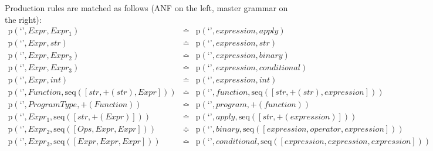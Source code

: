 Production rules are matched as follows (ANF on the left, master grammar on the right):
\begin{eqnarray*}
\mathrm{p}\left(\text{`'},\mathit{Expr},\mathit{Expr_1}\right) & \bumpeq & \mathrm{p}\left(\text{`'},\mathit{expression},\mathit{apply}\right) \\
\mathrm{p}\left(\text{`'},\mathit{Expr},str\right) & \bumpeq & \mathrm{p}\left(\text{`'},\mathit{expression},str\right) \\
\mathrm{p}\left(\text{`'},\mathit{Expr},\mathit{Expr_2}\right) & \bumpeq & \mathrm{p}\left(\text{`'},\mathit{expression},\mathit{binary}\right) \\
\mathrm{p}\left(\text{`'},\mathit{Expr},\mathit{Expr_3}\right) & \bumpeq & \mathrm{p}\left(\text{`'},\mathit{expression},\mathit{conditional}\right) \\
\mathrm{p}\left(\text{`'},\mathit{Expr},int\right) & \bumpeq & \mathrm{p}\left(\text{`'},\mathit{expression},int\right) \\
\mathrm{p}\left(\text{`'},\mathit{Function},\mathrm{seq}\left(\left[str, \plus \left(str\right), \mathit{Expr}\right]\right)\right) & \bumpeq & \mathrm{p}\left(\text{`'},\mathit{function},\mathrm{seq}\left(\left[str, \plus \left(str\right), \mathit{expression}\right]\right)\right) \\
\mathrm{p}\left(\text{`'},\mathit{ProgramType},\plus \left(\mathit{Function}\right)\right) & \bumpeq & \mathrm{p}\left(\text{`'},\mathit{program},\plus \left(\mathit{function}\right)\right) \\
\mathrm{p}\left(\text{`'},\mathit{Expr_1},\mathrm{seq}\left(\left[str, \plus \left(\mathit{Expr}\right)\right]\right)\right) & \bumpeq & \mathrm{p}\left(\text{`'},\mathit{apply},\mathrm{seq}\left(\left[str, \plus \left(\mathit{expression}\right)\right]\right)\right) \\
\mathrm{p}\left(\text{`'},\mathit{Expr_2},\mathrm{seq}\left(\left[\mathit{Ops}, \mathit{Expr}, \mathit{Expr}\right]\right)\right) & \Bumpeq & \mathrm{p}\left(\text{`'},\mathit{binary},\mathrm{seq}\left(\left[\mathit{expression}, \mathit{operator}, \mathit{expression}\right]\right)\right) \\
\mathrm{p}\left(\text{`'},\mathit{Expr_3},\mathrm{seq}\left(\left[\mathit{Expr}, \mathit{Expr}, \mathit{Expr}\right]\right)\right) & \bumpeq & \mathrm{p}\left(\text{`'},\mathit{conditional},\mathrm{seq}\left(\left[\mathit{expression}, \mathit{expression}, \mathit{expression}\right]\right)\right) \\
\end{eqnarray*}
